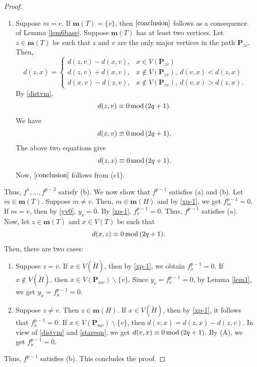 \documentclass[preprint,12pt]{elsarticle}
\newcommand{\1}{\mathbf{1}}
\newcommand{\0}{\mathbf{0}}
\newcommand{\p}{{\mathbf{P}}}
\def\m{\mathbf{m}}
\def\p{\mathbf{P}}
\begin{document}
\begin{proof}
\begin{enumerate}
    \item[(c2)] Suppose $m=v$. 
    If $\m(T)=\{v\}$, then $\eqref{conclusion}$ follows as a consequence of Lemma \ref{lem6base}.
    Suppose $\m(T)$ has at least two vertices. Let $z \in \m(T)$ be such that $z$ and $v$ are the only major vertices in
    the path $\p_{zv}$. Then, 
    \begin{equation*}
d(z,x)=
\begin{cases}
 d(z,v)-d(x,v), & x \in V(\p_{zv}) \\
d(z,v)+d(x,v), & x \notin V(\p_{zv}), ~d(v,x)<d(z,x) \\
d(x,v)-d(z,v),  & x \notin V(\p_{zv}), ~d(v,x)>d(z,x).
\end{cases}
\end{equation*}
By \eqref{distvm}, \[d(z,v) \equiv 0\,{\rm{mod}}\,(2q+1).\] We have \[d(x,v)\equiv 0\,{\rm{mod}}\,(2q+1).\]
The above two equations give 
\[d(z,x)\equiv 0\,{\rm{mod}}\,(2q+1).\]
Now, $\eqref{conclusion}$ follows from (c1).   
\end{enumerate}
Thus, $f^1,\dotsc,f^{p-2}$ satisfy (b).
We now show that $f^{p-1}$ satisfies (a) and (b). 
Let $m\in \m(T)$. Suppose $m\neq v$. 
Then, $m\in \m(H)$ and by \eqref{xp-1}, we get $f^{p-1}_m=0$. If $m=v$, then by \eqref{yv0}, $y_v=0$. By \eqref{xp-1}, $f^{p-1}_v=0$.
Thus, $f^{p-1}$ satisfies (a). Now, let $z\in \m(T)$ and $x\in V(T)$ be such that 
\begin{equation}\label{stareqn}
d(x,z)\equiv 0\,{\rm{mod}}\,(2q+1).    
\end{equation}
Then, there are two cases:
\begin{enumerate}
    \item[(A)]  Suppose $z=v$. If $x\in V(\widetilde{H})$, then by \eqref{xp-1}, we obtain $f^{p-1}_x=0$. 
    If $x \notin V(\widetilde{H})$, then $x\in V(\p_{uw})\smallsetminus \{v\}$.    Since $y_v=f^{p-1}_v=0$, by Lemma \ref{lem1}, we get $y_x=f^{p-1}_x=0$.
    \item[(B)] Suppose $z\neq v$. Then $z\in \m(H)$. If $x\in V(\widetilde{H})$, then 
    by \eqref{xp-1}, it follows that
    $f^{p-1}_x=0$. If $x\in V(\p_{uw})\smallsetminus \{v\}$, then $d(v,x)=d(z,x)-d(z,v)$.
    In view of \eqref{distvm} and \eqref{stareqn}, we get $d(v,x)\equiv 0\,{\rm{mod}}\,(2q+1)$. 
    By (A), we get $f^{p-1}_x=0$.
\end{enumerate}
Thus, $f^{p-1}$ satisfies (b). This concludes the proof.
\end{proof}
\end{document}
